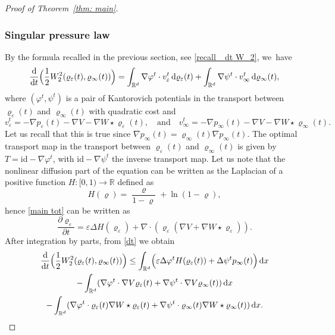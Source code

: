 \documentclass[JEP,XML,SOM,Unicode,published]{cedram}
\newcommand{\Bprt}[1]{\Bigl(#1\Bigr)}
\newcommand{\partialt}[1]{\dfrac{\partial#1}{\partial t}}
\newcommand{\dx}[1]{\mathop{}\!\mathrm{d} #1}
\newcommand{\ddt}{\frac{\dx{}}{\dx{t}}}
\newcommand{\R}{\mathbb{R}}
\theoremstyle{plain}
\theoremstyle{remark}
\begin{document}
\begin{proof}[Proof of Theorem~\ref{thm: main}]
\subsubsection*{Singular pressure law}
By the formula recalled in the previous section, see \eqref{recall_ dt W_2}, we~have\enlargethispage{-3\baselineskip}
\begin{equation}\label{dt}
\ddt \Bprt{\frac 12 W_2^2(\varrho_\varepsilon(t), \varrho_\infty(t))} = \int_{\R^d} \nabla \varphi^t \cdot v^t_\varepsilon \dx{\varrho_\varepsilon(t)} + \int_{\R^d} \nabla \psi^t \cdot v^t_\infty \dx{\varrho_\infty(t)},
\end{equation}
where $(\varphi^t, \psi^t)$ is a pair of Kantorovich potentials in the transport between $\varrho_\varepsilon(t)$ and $\varrho_\infty(t)$ with quadratic cost and
\[
v^t_\varepsilon = -\nabla p_\varepsilon(t) - \nabla V - \nabla W \star \varrho_\varepsilon(t),\quad \text{and}\quad v^t_\infty = -\nabla p_\infty(t) - \nabla V - \nabla W \star \varrho_\infty(t).
\]
Let us recall that this is true since $\nabla p_\infty(t) = \varrho_\infty(t)\nabla p_\infty(t)$.
The optimal transport map in the transport between $\varrho_\varepsilon(t)$ and $\varrho_\infty(t)$ is given by $T= \mathrm{id} - \nabla \varphi^t$, with $\mathrm{id} - \nabla \psi^t$ the inverse transport map.
Let us note that the nonlinear diffusion part of the equation can be written as the Laplacian of a positive function $H:[0,1)\to\R$ defined as
\begin{equation}\label{eq: H}
H(\varrho) = \frac{\varrho}{1-\varrho} + \ln (1-\varrho),
\end{equation}
hence \eqref{main tot} can be written as
\begin{equation*}\label{main tot es}
\partialt{\varrho_\varepsilon} = \varepsilon\Delta H(\varrho_\varepsilon)+ \nabla \cdot(\varrho_\varepsilon( \nabla V + \nabla W \star \varrho_\varepsilon)).
\end{equation*}
After integration by parts, from \eqref{dt} we obtain
\begin{multline}\label{dt W2}
\ddt \Bigl(\frac 12 W_2^2(\varrho_\varepsilon(t), \varrho_\infty(t))\Bigr)
\leq \int_{\R^d} \Bprt{\varepsilon \Delta \varphi^t H(\varrho_\varepsilon(t)) +\Delta \psi^t p_\infty(t) }\dx x\\
- \int_{\R^d} (\nabla \varphi^t \cdot \nabla V \varrho_\varepsilon(t) + \nabla \psi^t \cdot \nabla V \varrho_\infty(t)) \dx x\\
- \int_{\R^d} (\nabla \varphi^t \cdot \varrho_\varepsilon(t)\nabla W\star \varrho_\varepsilon(t) +\nabla \psi^t \cdot \varrho_\infty(t)\nabla W\star \varrho_\infty(t)) \dx x.

\end{multline}
\end{proof}
\end{document}
